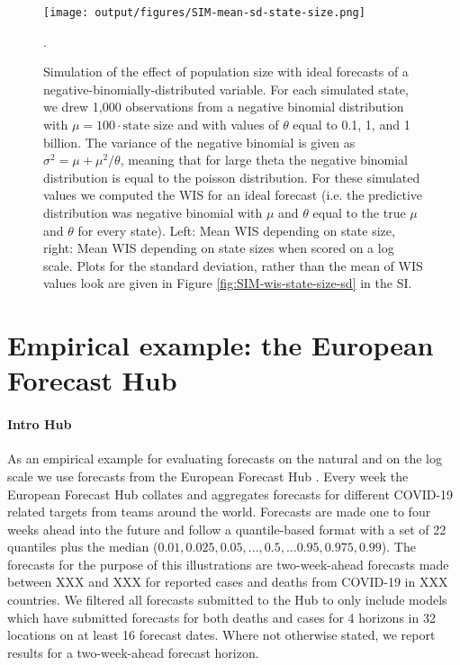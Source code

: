 \documentclass{article}
\begin{document}
\begin{figure}[h!]
    \centering
    \texttt{[image: output/figures/SIM-mean-sd-state-size.png]}
    \caption{Simulation of the effect of population size with ideal forecasts of a negative-binomially-distributed variable. For each simulated state, we drew 1,000 observations from a negative binomial distribution with $\mu = 100 \cdot \text{state size}$ and with values of $\theta$ equal to 0.1, 1, and 1 billion. The variance of the negative binomial is given as $\sigma^2 = \mu + \mu^2 / \theta$, meaning that for large theta the negative binomial distribution is equal to the poisson distribution. For these simulated values we computed the WIS for an ideal forecast (i.e. the predictive distribution was negative binomial with $\mu$ and $\theta$ equal to the true $\mu$ and $\theta$ for every state). Left: Mean WIS depending on state size, right: Mean WIS depending on state sizes when scored on a log scale. Plots for the standard deviation, rather than the mean of WIS values look are given in Figure \ref{fig:SIM-wis-state-size-sd} in the SI.}. 
    \label{fig:SIM-wis-state-size-mean}
\end{figure}





\section{Empirical example: the European Forecast Hub}

\paragraph{Intro Hub}
As an empirical example for evaluating forecasts on the natural and on the log scale we use forecasts from the European Forecast Hub \citep{europeancovid-19forecasthubEuropeanCovid19Forecast2021, sherrattPredictivePerformanceMultimodel2022}. Every week the European Forecast Hub collates and aggregates forecasts for different COVID-19 related targets from teams around the world. Forecasts are made one to four weeks ahead into the future and follow a quantile-based format with a set of 22 quantiles plus the median ($0.01, 0.025, 0.05, ..., 0.5, ... 0.95, 0.975, 0.99$). The forecasts for the purpose of this illustrations are two-week-ahead forecasts made between XXX and XXX for reported cases and deaths from COVID-19 in XXX countries. We filtered all forecasts submitted to the Hub to only include models which have submitted forecasts for both deaths and cases for 4 horizons in 32 locations on at least 16 forecast dates. Where not otherwise stated, we report results for a two-week-ahead forecast horizon. 
\end{document}
